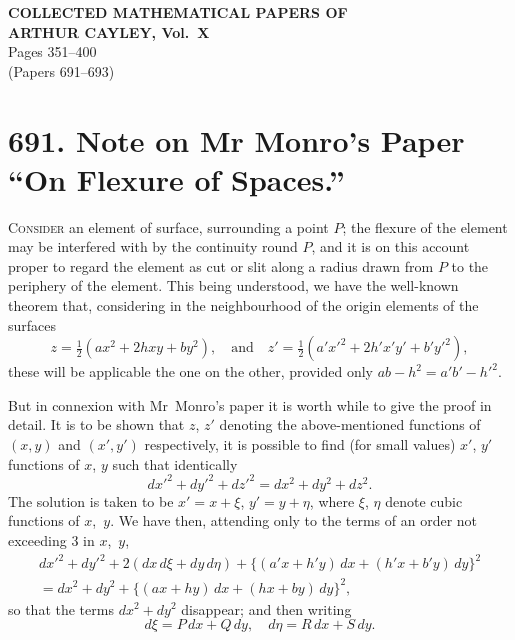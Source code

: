 \documentclass[12pt,a4paper]{article}
\begin{document}
\thispagestyle{empty}
\begin{center}
{\LARGE\bfseries COLLECTED MATHEMATICAL PAPERS OF}\\[6pt]
{\LARGE\bfseries ARTHUR CAYLEY, Vol.\ X}\\[12pt]
{\large Pages 351--400}\\[6pt]
{\small (Papers 691--693)}
\end{center}

\vfill

\tableofcontents

\newpage

\section*{691. Note on Mr Monro's Paper ``On Flexure of Spaces.''}
\label{paper:691}


\bigskip

\textsc{Consider} an element of surface, surrounding a point $P$; the flexure of the element may be interfered with by the continuity round $P$, and it is on this account proper to regard the element as cut or slit along a radius drawn from $P$ to the periphery of the element. This being understood, we have the well-known theorem that, considering in the neighbourhood of the origin elements of the surfaces
\[
z = \tfrac{1}{2}(ax^2 + 2hxy + by^2),
\quad\text{and}\quad
z' = \tfrac{1}{2}(a'x'^2 + 2h'x'y' + b'y'^2),
\]
these will be applicable the one on the other, provided only $ab - h^2 = a'b' - h'^2$.

But in connexion with Mr~Monro's paper it is worth while to give the proof in detail. It is to be shown that $z$, $z'$ denoting the above-mentioned functions of $(x, y)$ and $(x', y')$ respectively, it is possible to find (for small values) $x'$, $y'$ functions of $x$, $y$ such that identically
\[
dx'^2 + dy'^2 + dz'^2 = dx^2 + dy^2 + dz^2.
\]
The solution is taken to be $x' = x + \xi$, $y' = y + \eta$, where $\xi$, $\eta$ denote cubic functions of $x$,~$y$. We have then, attending only to the terms of an order not exceeding 3 in $x$,~$y$,
\begin{multline*}
dx'^2 + dy'^2 + 2(dx\,d\xi + dy\,d\eta) + \{(a'x + h'y)\,dx + (h'x + b'y)\,dy\}^2 \\
= dx^2 + dy^2 + \{(ax + hy)\,dx + (hx + by)\,dy\}^2,
\end{multline*}
so that the terms $dx^2 + dy^2$ disappear; and then writing
\[
d\xi = P\,dx + Q\,dy,\quad d\eta = R\,dx + S\,dy.
\]
\end{document}
